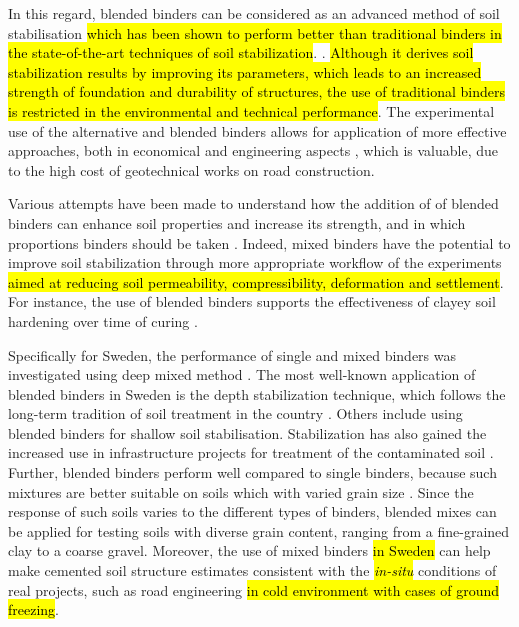 \documentclass[materials,article,submit,pdftex,moreauthors]{Definitions/mdpi}
\begin{document}
In this regard, blended binders can be considered as an advanced method of soil stabilisation \hl{which has been shown to perform better than traditional binders in the state-of-the-art techniques of soil stabilization}. \citep{Jegandanetal2010,Jafer2017}. \hl{Although it derives soil stabilization results by improving its parameters, which leads to an increased strength of foundation and durability of structures, the use of traditional binders is restricted in the environmental and technical performance}. The experimental use of the alternative and blended binders allows for application of more effective approaches, both in economical and engineering aspects \cite{Mavroulidou}, which is valuable, due to the high cost of geotechnical works on road construction. 

Various attempts have been made to understand how the addition of of blended binders can enhance soil properties and increase its strength, and in which proportions binders should be taken \citep{AlSwaidani,Fasihnikoutalab,Kogbara,Verhasselt,Sherwood,Chaddock}. Indeed, mixed binders have the potential to improve soil stabilization through more appropriate workflow of the experiments \hl{aimed at reducing soil permeability, compressibility, deformation and settlement}. For instance, the use of blended binders supports the effectiveness of clayey soil hardening over time of curing \cite{Wangetal2015,Gandhi,LindhLemenkova2021a}. 

Specifically for Sweden, the performance of single and mixed binders was investigated using deep mixed method \citep{Ahnberg1995,HolmAhnberg}. The most well-known application of blended binders in Sweden is the depth stabilization technique, which follows the long-term tradition of soil treatment in the country \cite{Bjerrum}. Others include using blended binders for shallow soil stabilisation. Stabilization has also gained the increased use in infrastructure projects for treatment of the contaminated soil \citep{Sorengard,LindhLemenkova2022b}. Further, blended binders perform well compared to single binders, because such mixtures are better suitable on soils which with varied grain size \citep{ElMahdi,Syed}. Since the response of such soils varies to the different types of binders, blended mixes can be applied for testing soils with diverse grain content, ranging from a fine-grained clay to a coarse gravel. Moreover, the use of mixed binders \hl{in Sweden} can help make cemented soil structure estimates consistent with the \hl{\emph{in-situ}} conditions of real projects, such as road engineering \hl{in cold environment with cases of ground freezing}. 
\end{document}
